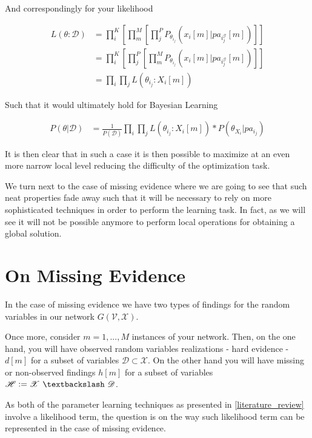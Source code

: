 \documentclass[11pt]{article}
\begin{document}
\begin{article}
And correspondingly for your likelihood

\begin{align} 
L(\theta : \mathscr{D}) &= \prod_i^K [\prod_m^M [\prod_j^P  P_{\theta_i_j}(x_i[m] | pa_i_j^{\mathscr{G}}[m])]] \nonumber \\
                        &= \prod_i^K [\prod_j^P [\prod_m^M  P_{\theta_i_j}(x_i[m] | pa_i_j^{\mathscr{G}}[m])]] \nonumber \\
                        &= \prod_i \prod_j L(\theta_i_j : X_i[m])  \nonumber
\end{align}

Such that it would ultimately hold for Bayesian Learning

\begin{align} 
P(\theta | \mathscr{D}) &= \frac{1}{P(\mathscr{D})} \prod_i \prod_j L(\theta_i_j : X_i[m]) * P(\theta_{X_i}|pa_i_j) \nonumber
\end{align}

It is then clear that in such a case it is then possible to
maximize at an even more narrow local level reducing the difficulty
of the optimization task.

We turn next to the case of missing evidence where we are going to
see that such neat properties fade away such that it will be
necessary to rely on more sophisticated techniques in order to
perform the learning task. In fact, as we will see it will not be
possible anymore to perform local operations for obtaining a global
solution.

\newpage

\section{On Missing Evidence}
\label{missing-learning}
In the case of missing evidence we have two types of findings for
the random variables in our network \(G(\mathscr{V}, \mathscr{X})\).

Once more, consider \(m = 1, ..., M\) instances of your network. Then,
on the one hand, you will have observed random variables
realizations - hard evidence - \(d[m]\) for a subset of variables
\(\mathscr{D} \subset \mathscr{X}\). On the other hand you will have
missing or non-observed findings \(h[m]\) for a subset of variables
\(\mathscr{H} \vcentcolon= \mathscr{X} \ \textbackslash \ \mathscr{D}\).

As both of the parameter learning techniques as presented in
\ref{literature_review} involve a likelihood term, the question is on
the way such likelihood term can be represented in the case of
missing evidence.


\end{article}
\end{document}
